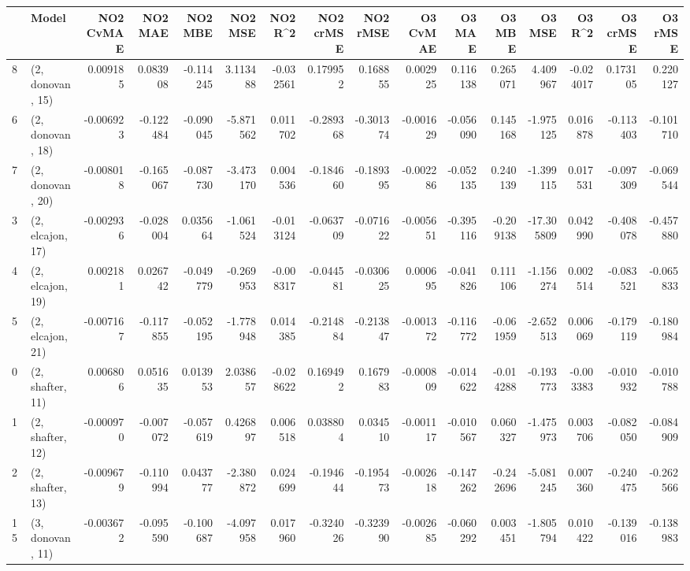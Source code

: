 \begin{tabular}{llrrrrrrrrrrrrrr}
\toprule
{} &             Model &  NO2 CvMAE &   NO2 MAE &   NO2 MBE &    NO2 MSE &   NO2 R\textasciicircum2 &  NO2 crMSE &  NO2 rMSE &  O3 CvMAE &    O3 MAE &    O3 MBE &     O3 MSE &    O3 R\textasciicircum2 &  O3 crMSE &   O3 rMSE \\
\midrule
8  &  (2, donovan, 15) &   0.009185 &  0.083908 & -0.114245 &   3.113488 & -0.032561 &   0.179952 &  0.168855 &  0.002925 &  0.116138 &  0.265071 &   4.409967 & -0.024017 &  0.173105 &  0.220127 \\
6  &  (2, donovan, 18) &  -0.006923 & -0.122484 & -0.090045 &  -5.871562 &  0.011702 &  -0.289368 & -0.301374 & -0.001629 & -0.056090 &  0.145168 &  -1.975125 &  0.016878 & -0.113403 & -0.101710 \\
7  &  (2, donovan, 20) &  -0.008018 & -0.165067 & -0.087730 &  -3.473170 &  0.004536 &  -0.184660 & -0.189395 & -0.002286 & -0.052135 &  0.240139 &  -1.399115 &  0.017531 & -0.097309 & -0.069544 \\
3  &  (2, elcajon, 17) &  -0.002936 & -0.028004 &  0.035664 &  -1.061524 & -0.013124 &  -0.063709 & -0.071622 & -0.005651 & -0.395116 & -0.209138 & -17.305809 &  0.042990 & -0.408078 & -0.457880 \\
4  &  (2, elcajon, 19) &   0.002181 &  0.026742 & -0.049779 &  -0.269953 & -0.008317 &  -0.044581 & -0.030625 &  0.000695 & -0.041826 &  0.111106 &  -1.156274 &  0.002514 & -0.083521 & -0.065833 \\
5  &  (2, elcajon, 21) &  -0.007167 & -0.117855 & -0.052195 &  -1.778948 &  0.014385 &  -0.214884 & -0.213847 & -0.001372 & -0.116772 & -0.061959 &  -2.652513 &  0.006069 & -0.179119 & -0.180984 \\
0  &  (2, shafter, 11) &   0.006806 &  0.051635 &  0.013953 &   2.038657 & -0.028622 &   0.169492 &  0.167983 & -0.000809 & -0.014622 & -0.014288 &  -0.193773 & -0.003383 & -0.010932 & -0.010788 \\
1  &  (2, shafter, 12) &  -0.000970 & -0.007072 & -0.057619 &   0.426897 &  0.006518 &   0.038804 &  0.034510 & -0.001117 & -0.010567 &  0.060327 &  -1.475973 &  0.003706 & -0.082050 & -0.084909 \\
2  &  (2, shafter, 13) &  -0.009679 & -0.110994 &  0.043777 &  -2.380872 &  0.024699 &  -0.194644 & -0.195473 & -0.002618 & -0.147262 & -0.242696 &  -5.081245 &  0.007360 & -0.240475 & -0.262566 \\
15 &  (3, donovan, 11) &  -0.003672 & -0.095590 & -0.100687 &  -4.097958 &  0.017960 &  -0.324026 & -0.323990 & -0.002685 & -0.060292 &  0.003451 &  -1.805794 &  0.010422 & -0.139016 & -0.138983 \\

\end{tabular}

